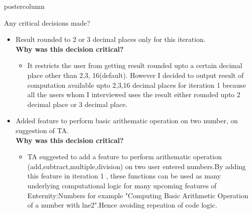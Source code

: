 \documentclass[final,hyperref={pdfpagelabels=false}]{beamer}
\begin{document}
\begin{frame}
\begin{columns}
\begin{column}{.49\textwidth}
\begin{beamercolorbox}[center,wd=\textwidth]{postercolumn}
\begin{minipage}[T]{.95\textwidth}
{\begin{block}{Any critical decisions made?}
\begin{itemize}
\begin{itemize}
                \end{itemize}
                    \item Result rounded to 2 or 3 decimal places only for this iteration. \\
             \textbf{ Why was this decision critical?}
                \begin{itemize}
                \item It restricts the user from getting result rounded upto a certain decimal place other than 2,3, 16(default). However I decided to output result of computation available upto 2,3,16 decimal places for iteration 1 because all the users whom I interviewed uses the result either rounded upto 2 decimal place or 3 decimal place.
                \end{itemize}
                      \item Added feature to perform basic arithematic operation on two number, on suggestion of TA.\\
             \textbf{ Why was this decision critical?}
                \begin{itemize}
                \item TA suggested to add a feature to perform arithematic operation (add,subtract,multiple,division) on two user entered numbers.By adding this feature in iteration 1 , these functions can be used as many underlying computational logic for many upcoming features of Enternity:Numbers for example "Computing Basic Arithmetic Operation of a number with lne2".Hence avoiding repeation of code logic. 
                \end{itemize}
              \end{itemize}
              
            
            \end{block}
            \vfill

          }
        \end{minipage}
      \end{beamercolorbox}
    \end{column}


\end{columns}
\end{frame}
\end{document}
